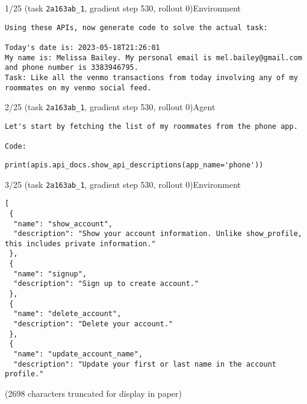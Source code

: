 
\hspace*{8mm}%
\begin{minipage}{0.95\linewidth}
\begin{user_message_box}{{1/25 (task \texttt{2a163ab\_1}, gradient step 530, rollout 0)\hfill Environment}}
\scriptsize
\begin{Verbatim}[breaklines]
Using these APIs, now generate code to solve the actual task:

Today's date is: 2023-05-18T21:26:01
My name is: Melissa Bailey. My personal email is mel.bailey@gmail.com and phone number is 3383946795.
Task: Like all the venmo transactions from today involving any of my roommates on my venmo social feed.
\end{Verbatim}
\end{user_message_box}
\end{minipage}

\begin{minipage}{0.95\linewidth}
\begin{assistant_message_box}{{2/25 (task \texttt{2a163ab\_1}, gradient step 530, rollout 0)\hfill Agent}}
\scriptsize
\begin{Verbatim}[breaklines]
Let's start by fetching the list of my roommates from the phone app.

Code:
\end{Verbatim}
\begin{tcolorbox}[colback=codebgcolor,boxrule=0pt]\begin{Verbatim}[breaklines]
print(apis.api_docs.show_api_descriptions(app_name='phone'))
\end{Verbatim}
\end{tcolorbox}\end{assistant_message_box}
\end{minipage}

\hspace*{8mm}%
\begin{minipage}{0.95\linewidth}
\begin{user_message_box}{{3/25 (task \texttt{2a163ab\_1}, gradient step 530, rollout 0)\hfill Environment}}
\scriptsize
\begin{Verbatim}[breaklines]
[
 {
  "name": "show_account",
  "description": "Show your account information. Unlike show_profile, this includes private information."
 },
 {
  "name": "signup",
  "description": "Sign up to create account."
 },
 {
  "name": "delete_account",
  "description": "Delete your account."
 },
 {
  "name": "update_account_name",
  "description": "Update your first or last name in the account profile."
\end{Verbatim}
(2698 characters truncated for display in paper)\end{user_message_box}
\end{minipage}


